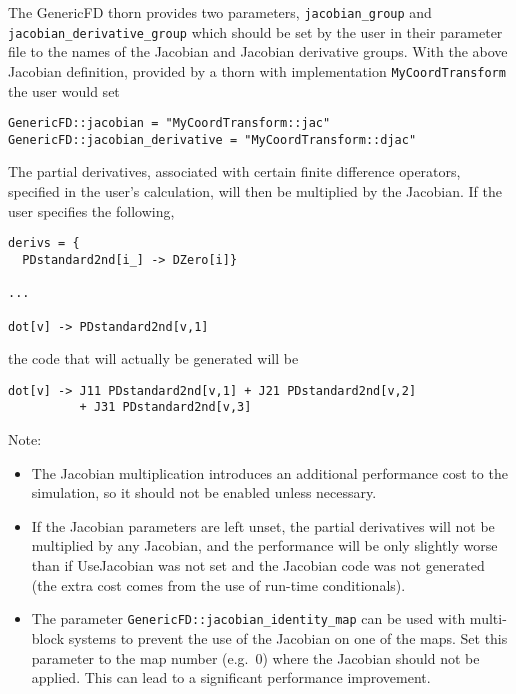 \documentclass{report}
\begin{document}
The GenericFD thorn provides two parameters, \verb|jacobian_group| and
\verb|jacobian_derivative_group| which should be set by the user in their
parameter file to the names of the Jacobian and Jacobian derivative
groups.  With the above Jacobian definition, provided by a thorn with
implementation \verb|MyCoordTransform| the user would set

\begin{verbatim}
GenericFD::jacobian = "MyCoordTransform::jac"
GenericFD::jacobian_derivative = "MyCoordTransform::djac"
\end{verbatim}

The partial derivatives, associated with certain finite difference
operators, specified in the user's calculation, will then be
multiplied by the Jacobian.  If the user specifies the following,

\begin{center}
\begin{minipage}{0.8 \textwidth}
\begin{verbatim}
derivs = {
  PDstandard2nd[i_] -> DZero[i]}

...

dot[v] -> PDstandard2nd[v,1]
\end{verbatim}
\end{minipage}
\end{center}

the code that will actually be generated will be

\begin{center}
\begin{minipage}{0.8 \textwidth}
\begin{verbatim}
dot[v] -> J11 PDstandard2nd[v,1] + J21 PDstandard2nd[v,2]
          + J31 PDstandard2nd[v,3]
\end{verbatim}
\end{minipage}
\end{center}

Note:

\begin{itemize}
\item The Jacobian multiplication introduces an additional performance
  cost to the simulation, so it should not be enabled unless
  necessary.
\item If the Jacobian parameters are left unset, the partial
  derivatives will not be multiplied by any Jacobian, and the
  performance will be only slightly worse than if UseJacobian was not
  set and the Jacobian code was not generated (the extra cost comes
  from the use of run-time conditionals).
\item The parameter \verb|GenericFD::jacobian_identity_map| can be
  used with multi-block systems to prevent the use of the Jacobian on
  one of the maps.  Set this parameter to the map number (e.g.~0)
  where the Jacobian should not be applied.  This can lead to a
  significant performance improvement.
\end{itemize}
\end{document}
